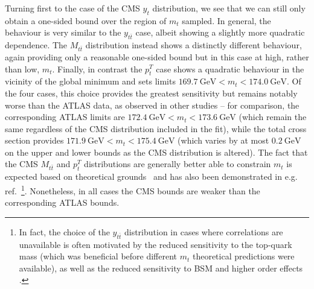 \documentclass[sn-mathphys]{sn-jnl}%
\newcommand{\pT}{p^T_t}
\newcommand{\mtt}{M_{t\bar{t}}}
\newcommand{\yt}{y_{t}}
\newcommand{\ytt}{y_{t\bar{t}}}
\newcommand{\mt}{m_t}
\newcommand{\gev}{\mathrm{GeV}}
\begin{document}
Turning first to the case of the CMS $\yt$ distribution, we see that we can still only obtain a one-sided bound over the region of $\mt$ sampled. In general, the behaviour is very similar to the $\ytt$ case, albeit showing a slightly more quadratic dependence. The $\mtt$ distribution instead shows a distinctly different behaviour, again providing only a reasonable one-sided bound but in this case at high, rather than low, $\mt$. Finally, in contrast the $\pT$ case shows a quadratic behaviour in the vicinity of the global minimum and sets limits $169.7~\gev\lt\mt\lt174.0~\gev$. Of the four cases, this choice provides the greatest sensitivity but remains notably worse than the ATLAS data, as observed in other studies -- for comparison, the corresponding ATLAS limits are $172.4~\gev<\mt<173.6~\gev$ (which remain the same regardless of the CMS distribution included in the fit), while the total cross section provides $171.9~\gev<\mt<175.4~\gev$ (which varies by at most $0.2~\gev$ on the upper and lower bounds as the CMS distribution is altered). The fact that the CMS $\mtt$ and $\pT$ distributions are generally better able to constrain $\mt$ is expected based on theoretical grounds~\cite{Czakon:2016vfr,Czakon:2016olj,Ju:2019mqc} and has also been demonstrated in e.g. ref.~\cite{Cooper-Sarkar:2020twv}\footnote{In fact, the choice of the $\ytt$ distribution in cases where correlations are unavailable is often motivated by the reduced sensitivity to the top-quark mass (which was beneficial before different $\mt$ theoretical predictions were available), as well as the reduced sensitivity to BSM and higher order effects \cite{NNPDF:2017mvq,NNPDF:2021njg,Kadir:2020yml}.}. Nonetheless, in all cases the CMS bounds are weaker than the corresponding ATLAS bounds.
\end{document}
